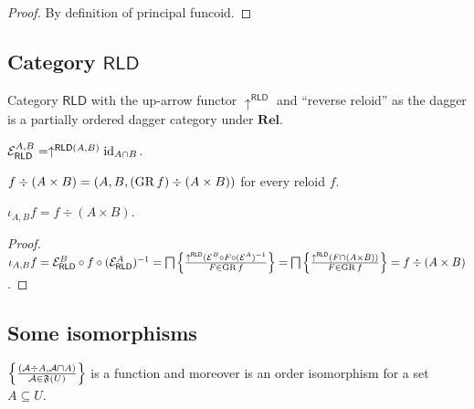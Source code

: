 \begin{proof}
  By definition of principal funcoid.
\end{proof}

\subsection{\texorpdfstring{Category $\mathsf{RLD}$}{Category RLD}}

Category $\mathsf{RLD}$ with the up-arrow functor
$\uparrow^{\mathsf{RLD}}$ and ``reverse reloid'' as the dagger is a
partially ordered dagger category under $\mathbf{Rel}$.

\begin{obvious}
$\mathcal{E}_{\mathsf{RLD}}^{A,B} = \uparrow^{\mathsf{RLD} (A ,
B)} \operatorname{id}_{A \cap B}$.
\end{obvious}

\begin{defn}
  $f \div (A \times B) = (A , B , (\operatorname{GR} f) \div (A \times B))$ for every
  reloid $f$.
\end{defn}

\begin{prop}
  $\iota_{A, B} f = f \div (A \times B)$.
\end{prop}

\begin{proof}
  $\iota_{A, B} f = \mathcal{E}_{\mathsf{RLD}}^{B}
\circ f \circ (\mathcal{E}_{\mathsf{RLD}}^{A})^{-1} =
\bigsqcap \left\{ \frac{ \uparrow^{\mathsf{RLD}} (\mathcal{E}^{B} \circ F \circ (\mathcal{E}^{A})^{-1}
}{ F \in \operatorname{GR} f }\right\} = \bigsqcap \left\{ \frac{
\uparrow^{\mathsf{RLD}} (F \cap (A \times B))}{F \in \operatorname{GR} f }\right\} = f \div (A \times B)$.

\end{proof}

\subsection{Some isomorphisms}

\begin{prop}
  $\left\{ \frac{ (\mathcal{A} \div A , \mathcal{A} \sqcap A) }{
  \mathcal{A} \in \mathfrak{F} (U) }\right\}$ is a function and
  moreover is an order isomorphism for a set $A \subseteq U$.
\end{prop}

